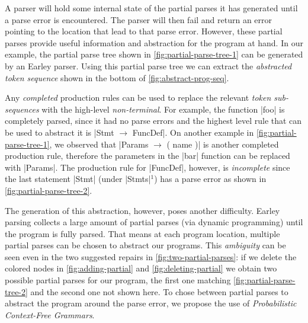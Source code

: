 A parser will hold some internal state of the partial parses it has
generated until a parse error is encountered. The parser will then fail and
return an error pointing to the location that lead to that parse error. However,
these partial parses provide useful information and abstraction for the program
at hand. In our example, the partial parse tree shown in
\autoref{fig:partial-parse-tree-1} can be generated by an Earley parser. Using
this partial parse tree we can extract the \emph{abstracted token sequence}
shown in the bottom of \autoref{fig:abstract-prog-seq}.

Any \emph{completed} production rules can be used to replace the relevant
\emph{token sub-sequences} with the high-level \emph{non-terminal}. For example,
the function |foo| is completely parsed, since it had no parse errors and the
highest level rule that can be used to abstract it is
%
|Stmt $\rightarrow$ FuncDef|. On another example in
\autoref{fig:partial-parse-tree-1}, we observed that
%
|Params $\rightarrow$ ( name )| is another completed production rule, therefore
the parameters in the |bar| function can be replaced with |Params|. The
production rule for |FuncDef|, however, is \emph{incomplete} since the last
statement |Stmt| (under |Stmts|$^1$) has a parse error as shown in
\autoref{fig:partial-parse-tree-2}.

The generation of this abstraction, however, poses another difficulty. Earley
parsing collects a large amount of partial parses (via dynamic programming)
until the program is fully parsed. That means at each program location, multiple
partial parses can be chosen to abstract our programs. This \emph{ambiguity} can
be seen even in the two suggested repairs in \autoref{fig:two-partial-parses}:
if we delete the colored nodes in \autoref{fig:adding-partial} and
\autoref{fig:deleting-partial} we obtain two possible partial parses for our
program, the first one matching \autoref{fig:partial-parse-tree-2} and the
second one not shown here. To chose between partial parses to abstract the
program around the parse error, we propose the use of \emph{Probabilistic
Context-Free Grammars}.


